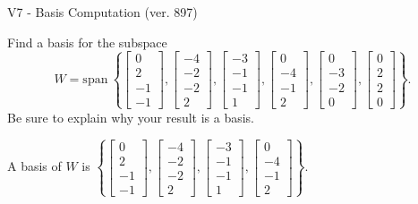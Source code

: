 \begin{exercise}
  \begin{exerciseTitle}V7 - Basis Computation (ver. 897)\end{exerciseTitle}
  \begin{exerciseStatement}
    Find a basis for the subspace 
\[W=\mathrm{span}\ \left\{\left[\begin{array}{r}
0 \\
2 \\
-1 \\
-1
\end{array}\right] , \left[\begin{array}{r}
-4 \\
-2 \\
-2 \\
2
\end{array}\right] , \left[\begin{array}{r}
-3 \\
-1 \\
-1 \\
1
\end{array}\right] , \left[\begin{array}{r}
0 \\
-4 \\
-1 \\
2
\end{array}\right] , \left[\begin{array}{r}
0 \\
-3 \\
-2 \\
0
\end{array}\right] , \left[\begin{array}{r}
0 \\
2 \\
2 \\
0
\end{array}\right]\right\}.\]
 Be sure to explain why your result is a basis.


  \end{exerciseStatement}
  \begin{exerciseAnswer}
   A basis of \(W\) is  \(\left\{\left[\begin{array}{r}
0 \\
2 \\
-1 \\
-1
\end{array}\right] , \left[\begin{array}{r}
-4 \\
-2 \\
-2 \\
2
\end{array}\right] , \left[\begin{array}{r}
-3 \\
-1 \\
-1 \\
1
\end{array}\right] , \left[\begin{array}{r}
0 \\
-4 \\
-1 \\
2
\end{array}\right]\right\}\).
  


  \end{exerciseAnswer}
\end{exercise}